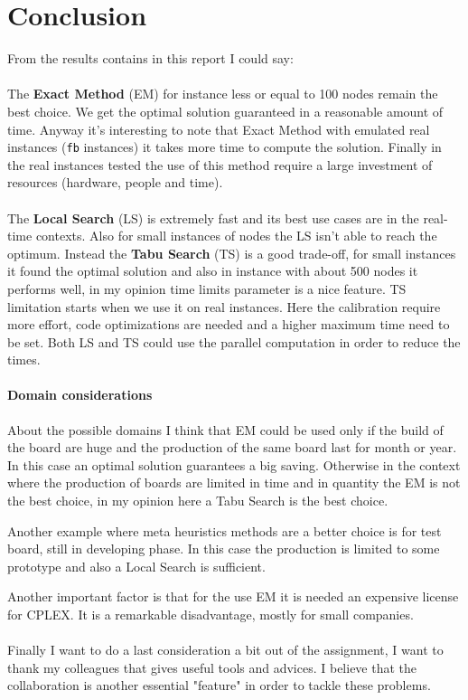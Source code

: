 \section{Conclusion}

	From the results contains in this report I could say:
	
	\paragraph{} The \textbf{Exact Method} (EM) for instance less or equal to 100 nodes remain the best choice. We get the optimal solution guaranteed in a reasonable amount of time. Anyway it's interesting to note that Exact Method with emulated real instances (\verb|fb| instances) it takes more time to compute the solution. Finally in the real instances tested the use of this method require a large investment of resources (hardware, people and time).
	
	\paragraph{} The \textbf{Local Search} (LS) is extremely fast and its best use cases are in the real-time contexts. Also for small instances of nodes the LS isn't able to reach the optimum. Instead the \textbf{Tabu Search} (TS) is a good trade-off, for small instances it found the optimal solution and also in instance with about 500 nodes it performs well, in my opinion time limits parameter is a nice feature. TS limitation starts when we use it on real instances. Here the calibration require more effort, code optimizations are needed and a higher maximum time need to be set. Both LS and TS could use the parallel computation in order to reduce the times.
	
	\paragraph{Domain considerations} About the possible domains I think that EM could be used only if the build of the board are huge and the production of the same board last for month or year. In this case an optimal solution guarantees a big saving. Otherwise in the context where the production of boards are limited in time and in quantity the EM is not the best choice, in my opinion here a Tabu Search is the best choice.
	
	Another example where meta heuristics methods are a better choice is for test board, still in developing phase. In this case the production is limited to some prototype and also a Local Search is sufficient. 
	
	Another important factor is that for the use EM it is needed an expensive license for CPLEX. It is a remarkable disadvantage, mostly for small companies.
	
	\paragraph{} Finally I want to do a last consideration a bit out of the assignment, I want to thank my colleagues that gives useful tools and advices. I believe that the collaboration is another essential "feature" in order to tackle these problems.

		
	